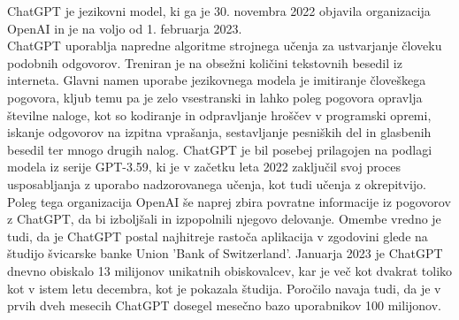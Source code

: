 \documentclass[a4paper,12pt,openright]{book}
\begin{document}
ChatGPT je jezikovni model, ki ga je 30. novembra 2022 objavila organizacija OpenAI in je na voljo od 1. februarja 2023. \cite{openai_codex} \\
ChatGPT uporablja napredne algoritme strojnega učenja za ustvarjanje človeku podobnih odgovorov. Treniran je na obsežni količini tekstovnih besedil iz interneta. Glavni namen uporabe jezikovnega modela je imitiranje človeškega pogovora, kljub temu pa je zelo vsestranski in lahko poleg pogovora opravlja številne naloge, kot so kodiranje in odpravljanje hroščev v programski opremi, iskanje odgovorov na izpitna vprašanja, sestavljanje pesniških del in glasbenih besedil ter mnogo drugih nalog. ChatGPT je bil posebej prilagojen na podlagi modela iz serije GPT-3.59, ki je v začetku leta 2022 zaključil svoj proces usposabljanja z uporabo nadzorovanega učenja, kot tudi učenja z okrepitvijo. Poleg tega organizacija OpenAI še naprej zbira povratne informacije iz pogovorov z ChatGPT, da bi izboljšali in izpopolnili njegovo delovanje. Omembe vredno je tudi, da je ChatGPT postal najhitreje rastoča aplikacija v zgodovini glede na študijo švicarske banke Union 'Bank of Switzerland'. Januarja 2023 je ChatGPT dnevno obiskalo 13 milijonov unikatnih obiskovalcev, kar je več kot dvakrat toliko kot v istem letu decembra, kot je pokazala študija. Poročilo navaja tudi, da je v prvih dveh mesecih ChatGPT dosegel mesečno bazo uporabnikov 100 milijonov. \cite{yetistiren2023evaluating} \\
\end{document}
